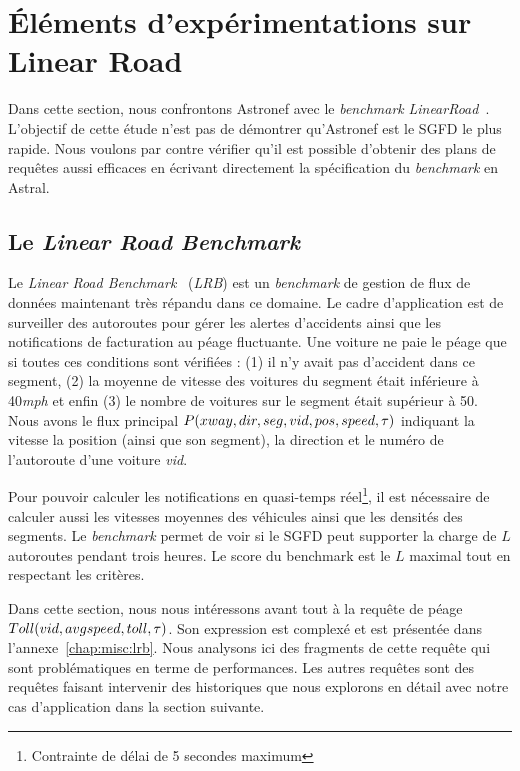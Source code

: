 \section{Éléments d'expérimentations sur Linear Road}\label{sec:valid:perfs:flux}
Dans cette section, nous confrontons Astronef avec le \textit{benchmark} \textit{LinearRoad}~\cite{Arasu:lrb}. L'objectif de cette étude n'est pas de démontrer qu'Astronef est le SGFD le plus rapide. Nous voulons par contre vérifier qu'il est possible d'obtenir des plans de requêtes aussi efficaces en écrivant directement la spécification du \textit{benchmark} en Astral.

\subsection{Le \textit{Linear Road Benchmark}}
Le \textit{Linear Road Benchmark}~\cite{Arasu:lrb} (\textit{LRB}) est un \textit{benchmark} de gestion de flux de données maintenant très répandu dans ce domaine. Le cadre d'application est de surveiller des autoroutes pour gérer les alertes d'accidents ainsi que les notifications de facturation au péage fluctuante. Une voiture ne paie le péage que si toutes ces conditions sont vérifiées : (1) il n'y avait pas d'accident dans ce segment, (2) la moyenne de vitesse des voitures du segment était inférieure à 40\textit{mph} et enfin (3) le nombre de voitures sur le segment était supérieur à 50. Nous avons le flux principal $P(xway, dir, seg, vid, pos, speed, \tau)$ indiquant la vitesse la position (ainsi que son segment), la direction et le numéro de l'autoroute d'une voiture \textit{vid}.

Pour pouvoir calculer les notifications en quasi-temps réel\footnote{Contrainte de délai de 5 secondes maximum}, il est nécessaire de calculer aussi les vitesses moyennes des véhicules ainsi que les densités des segments. Le \textit{benchmark} permet de voir si le SGFD peut supporter la charge de $L$ autoroutes pendant trois heures. Le score du benchmark est le $L$ maximal tout en respectant les critères.

Dans cette section, nous nous intéressons avant tout à la requête de péage $Toll(vid,avgspeed,toll,\tau)$. Son expression est complexé et est présentée dans l'annexe~\ref{chap:misc:lrb}. Nous analysons ici des fragments de cette requête qui sont problématiques en terme de performances. Les autres requêtes sont des requêtes faisant intervenir des historiques que nous explorons en détail avec notre cas d'application dans la section suivante.

